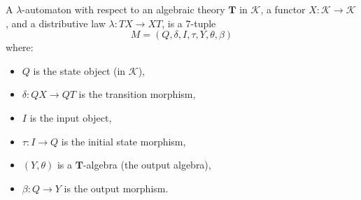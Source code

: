 A $\lambda$-automaton with respect to an algebraic theory $\mathbf{T}$ in $\mathcal{K}$, a functor $X \colon \mathcal{K} \longrightarrow \mathcal{K}$, and a distributive law $\lambda \colon TX \longrightarrow XT$, is a $7$-tuple
$$
M = (Q, \delta, I, \tau, Y, \theta, \beta)
$$
where:
\begin{itemize}
\item $Q$ is the state object (in $\mathcal{K}$),
\item $\delta \colon QX \longrightarrow QT$ is the transition morphism,
\item $I$ is the input object,
\item $\tau \colon I \longrightarrow Q$ is the initial state morphism,
\item $(Y, \theta)$ is a $\mathbf{T}$-algebra (the output algebra),
\item $\beta \colon Q \longrightarrow Y$ is the output morphism.
\end{itemize}
